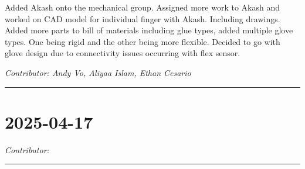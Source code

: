 \documentclass[12pt]{article}
\begin{document}
Added Akash onto the mechanical group. Assigned more work to Akash and worked on CAD model for individual finger with Akash. Including drawings.
Added more parts to bill of materials including glue types, added multiple glove types. One being rigid and the other being more flexible. Decided to go with glove design due to connectivity issues occurring with flex sensor.

\vspace{1em}
\noindent\textit{Contributor: Andy Vo, Aliyaa Islam, Ethan Cesario}
\vspace{1em}
\hrule

\section*{2025-04-17}
\vspace{1em}
\noindent\textit{Contributor: }
\vspace{1em}
\hrule
\end{document}
